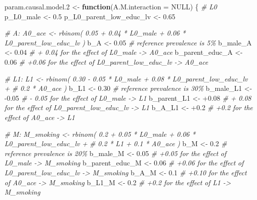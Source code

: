 \documentclass[
]{book}
\newenvironment{Shaded}{\begin{snugshade}}{\end{snugshade}}
\newcommand{\AttributeTok}[1]{\textcolor[rgb]{0.77,0.63,0.00}{#1}}
\newcommand{\CommentTok}[1]{\textcolor[rgb]{0.56,0.35,0.01}{\textit{#1}}}
\newcommand{\ConstantTok}[1]{\textcolor[rgb]{0.00,0.00,0.00}{#1}}
\newcommand{\ControlFlowTok}[1]{\textcolor[rgb]{0.13,0.29,0.53}{\textbf{#1}}}
\newcommand{\FloatTok}[1]{\textcolor[rgb]{0.00,0.00,0.81}{#1}}
\newcommand{\NormalTok}[1]{#1}
\newcommand{\OtherTok}[1]{\textcolor[rgb]{0.56,0.35,0.01}{#1}}
\newcommand{\SpecialCharTok}[1]{\textcolor[rgb]{0.00,0.00,0.00}{#1}}
\begin{document}
\begin{Shaded}
\begin{Highlighting}[]
\NormalTok{param.causal.model}\FloatTok{.2} \OtherTok{\textless{}{-}} \ControlFlowTok{function}\NormalTok{(}\AttributeTok{A.M.interaction =} \ConstantTok{NULL}\NormalTok{) \{}
\CommentTok{\# L0}
\NormalTok{p\_L0\_male }\OtherTok{\textless{}{-}} \FloatTok{0.5}
\NormalTok{p\_L0\_parent\_low\_educ\_lv }\OtherTok{\textless{}{-}} \FloatTok{0.65}

\CommentTok{\# A: A0\_ace \textless{}{-} rbinom( 0.05 + 0.04 * L0\_male + 0.06 * L0\_parent\_low\_educ\_lv ) }
\NormalTok{b\_A }\OtherTok{\textless{}{-}} \FloatTok{0.05}   \CommentTok{\# reference prevalence is 5\%}
\NormalTok{b\_male\_A }\OtherTok{\textless{}{-}} \FloatTok{0.04}  \CommentTok{\# + 0.04 for the effect of L0\_male {-}\textgreater{} A0\_ace}
\NormalTok{b\_parent\_educ\_A }\OtherTok{\textless{}{-}} \FloatTok{0.06}  \CommentTok{\# +0.06 for the effect of L0\_parent\_low\_educ\_lv {-}\textgreater{} A0\_ace}

\CommentTok{\# L1: L1 \textless{}{-} rbinom( 0.30 {-} 0.05 * L0\_male + 0.08 * L0\_parent\_low\_educ\_lv + }
\CommentTok{\#                   0.2 * A0\_ace ) }
\NormalTok{b\_L1 }\OtherTok{\textless{}{-}} \FloatTok{0.30}   \CommentTok{\# reference prevalence is 30\%}
\NormalTok{b\_male\_L1 }\OtherTok{\textless{}{-}} \SpecialCharTok{{-}}\FloatTok{0.05}  \CommentTok{\# {-} 0.05 for the effect of L0\_male {-}\textgreater{} L1}
\NormalTok{b\_parent\_L1 }\OtherTok{\textless{}{-}} \SpecialCharTok{+}\FloatTok{0.08} \CommentTok{\# + 0.08 for the effect of L0\_parent\_low\_educ\_lv {-}\textgreater{} L1}
\NormalTok{b\_A\_L1 }\OtherTok{\textless{}{-}} \SpecialCharTok{+}\FloatTok{0.2} \CommentTok{\# +0.2 for the effect of A0\_ace {-}\textgreater{} L1}

\CommentTok{\# M: M\_smoking \textless{}{-} rbinom( 0.2 + 0.05 * L0\_male + 0.06 * L0\_parent\_low\_educ\_lv + }
\CommentTok{\#                         0.2 * L1 + 0.1 * A0\_ace ) }
\NormalTok{b\_M }\OtherTok{\textless{}{-}} \FloatTok{0.2} \CommentTok{\# reference prevalence is 20\%}
\NormalTok{b\_male\_M }\OtherTok{\textless{}{-}} \FloatTok{0.05} \CommentTok{\# +0.05 for the effect of L0\_male {-}\textgreater{} M\_smoking}
\NormalTok{b\_parent\_educ\_M }\OtherTok{\textless{}{-}} \FloatTok{0.06} \CommentTok{\# +0.06 for the effect of L0\_parent\_low\_educ\_lv {-}\textgreater{} M\_smoking}
\NormalTok{b\_A\_M }\OtherTok{\textless{}{-}} \FloatTok{0.1} \CommentTok{\# +0.10 for the effect of A0\_ace {-}\textgreater{} M\_smoking}
\NormalTok{b\_L1\_M }\OtherTok{\textless{}{-}} \FloatTok{0.2} \CommentTok{\# +0.2 for the effect of L1 {-}\textgreater{} M\_smoking}


\end{Highlighting}
\end{Shaded}
\end{document}
